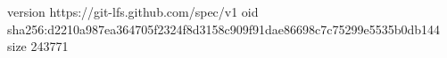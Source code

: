 version https://git-lfs.github.com/spec/v1
oid sha256:d2210a987ea364705f2324f8d3158c909f91dae86698c7c75299e5535b0db144
size 243771
